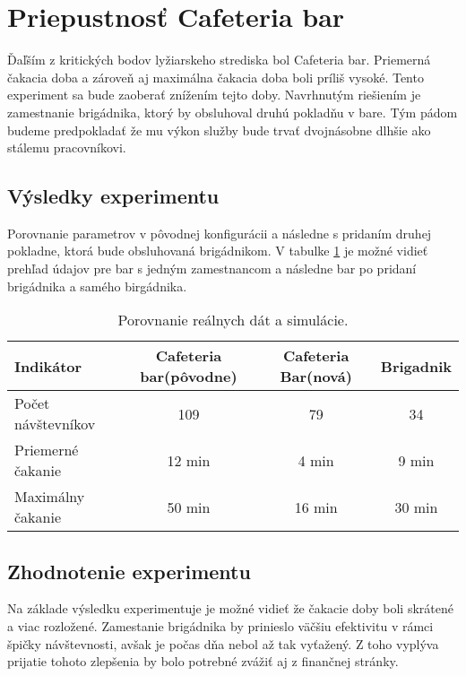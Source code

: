 \section{Priepustnosť Cafeteria bar}
Ďaľším z kritických bodov lyžiarskeho strediska bol Cafeteria bar. Priemerná čakacia doba a zároveň aj maximálna čakacia doba boli príliš vysoké.
Tento experiment sa bude zaoberať znížením tejto doby. Navrhnutým riešiením je zamestnanie brigádnika, ktorý by obsluhoval druhú pokladňu v bare.
Tým pádom budeme predpokladať že mu výkon služby bude trvať dvojnásobne dlhšie ako stálemu pracovníkovi.
\subsection{Výsledky experimentu}
Porovnanie parametrov v pôvodnej konfigurácii a následne s pridaním druhej pokladne, ktorá bude obsluhovaná brigádnikom.
V tabulke \ref{tab:caf} je možné vidieť prehľad údajov pre bar s jedným zamestnancom a následne bar po pridaní brigádnika a samého birgádnika.

\begin{table}[h!]
    \centering
    \begin{tabular}{@{}lccc@{}}
    \toprule
    Indikátor &  Cafeteria bar(pôvodne)  & Cafeteria Bar(nová) & Brigadnik\\ \midrule
    Počet návštevníkov & 109 & 79 & 34\\
    Priemerné čakanie & 12 min & 4 min & 9 min\\
    Maximálny čakanie & 50 min & 16 min & 30 min\\
    \bottomrule
    \end{tabular}
    \caption{Porovnanie reálnych dát a simulácie.}
    \label{tab:caf}
    \end{table}

\subsection{Zhodnotenie experimentu}
Na základe výsledku experimentuje je možné vidieť že čakacie doby boli skrátené a viac rozložené. Zamestanie brigádnika by prinieslo väčšiu 
efektivitu v rámci špičky návštevnosti, avšak je počas dňa nebol až tak vyťažený. Z toho vyplýva prijatie tohoto zlepšenia by bolo potrebné zvážiť
aj z finančnej stránky.
